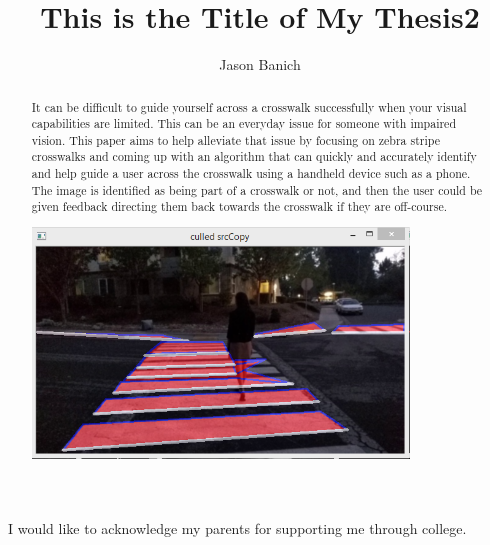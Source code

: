 \documentclass[12pt]{ucthesis}
\begin{document}

\title{This is the Title of My Thesis2}
\author{Jason Banich}
  
 
     



\maketitle

\begin{frontmatter}

\copyrightpage

\committeemembershippage

\begin{abstract}
It can be difficult to guide yourself across a crosswalk successfully when your visual capabilities are limited. This can be an everyday issue for someone with impaired vision. This paper aims to help alleviate that issue by focusing on zebra stripe crosswalks and coming up with an algorithm that can quickly and accurately identify and help guide a user across the crosswalk using a handheld device such as a phone. The image is identified as being part of a crosswalk or not, and then the user could be given feedback directing them back towards the crosswalk if they are off-course.


\includegraphics[width=10cm, angle=45]{testimg}

\end{abstract}

\begin{acknowledgements}
I would like to acknowledge my parents for supporting me through college.
\end{acknowledgements}


\tableofcontents


\listoftables

\listoffigures

\end{frontmatter}
\end{document}
